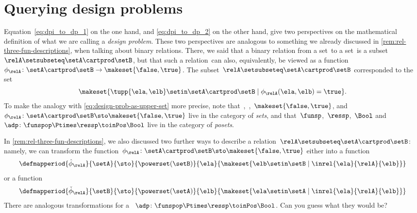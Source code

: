 
\section{Querying  design problems}
\label{sec:dp-querying}



Equation~\cref{eq:dpi_to_dp_1} on the one hand, and \cref{eq:dpi_to_dp_2} on the other hand, give two perspectives on the mathematical definition of what we are calling a \emph{design problem}.
These two perspectives are analogous to something we already discussed in \cref{rem:rel-three-fun-descriptions}, when talking about binary relations.
There, we said that a binary relation from a set~\setA to a set~\setB is a subset~$\relA \setsubseteq \setA \cartprod \setB$,
but that such a relation~\relA can also, equivalently, be viewed as a function~$\phi_{\relA}\colon \setA \cartprod\setB \to \makeset{ \false, \true }$.
The subset~$\relA \setsubseteq \setA \cartprod \setB$ corresponded to the set
\begin{equation}
    \makeset{ \tupp{\ela, \elb} \setin \setA \cartprod \setB \mid \phi_{\relA}(\ela, \elb) = \true }.
\end{equation}
%
To make the analogy with \cref{eq:design-prob-as-upper-set} more precise, note that~\setA,~\setB,~$\makeset{ \false, \true }$, and~$\phi_{\relA}\colon \setA \cartprod\setB \sto \makeset{ \false, \true }$ live in the category of \emph{sets}, and that~$\funsp$,~$\ressp$,~$\Bool$ and~$\adp\colon \funspop \Ptimes \ressp\toinPos \Bool$ live in the category of \emph{posets}.

In \cref{rem:rel-three-fun-descriptions}, we also discussed two further ways to describe a relation~$\relA \setsubseteq \setA \cartprod \setB$: namely, we can transform the function~$\phi_{\relA}\colon \setA \cartprod\setB \sto \makeset{ \false, \true }$ either into a function
\begin{equation}
    \label{eq:curried-relation-again}
    \defmapperiod{
        \hat \phi_{\relA}}{\setA}{\sto
    }{
        \powerset(\setB)
    }{
        \ela
    }{
        \makeset{ \elb \setin \setB \mid \inrel{\ela
            }{
                \relA
            }{
                \elb} }
    }
\end{equation}
or a function
\begin{equation}
    \label{eq:co-curried-relation-again}
    \defmapperiod{
        \check \phi_{\relA}}{\setB}{\sto
    }{
        \powerset (\setA)
    }{
        \elb
    }{
        \makeset{ \ela \setin \setA \mid \inrel{\ela
            }{
                \relA
            }{
                \elb}}
    }
\end{equation}
%
There are analogous transformations for a ~$\adp\colon \funspop \Ptimes \ressp\toinPos \Bool$.
Can you guess what they would be?

